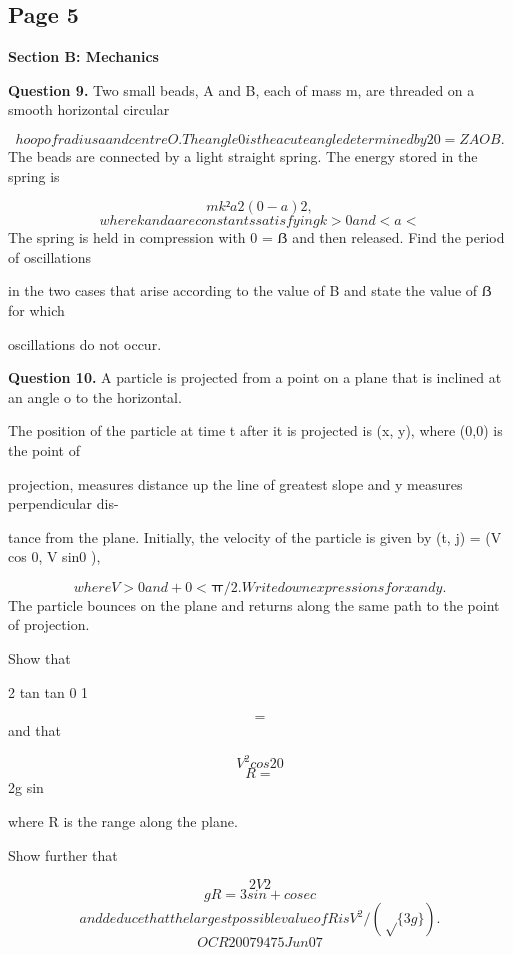\documentclass[12pt]{article}
\begin{document}
\subsection*{Page 5}
\begin{flushleft}
\bigskip\textbf{Section B: Mechanics}\par
\bigskip\textbf{Question 9.} Two small beads, A and B, each of mass m, are threaded on a smooth horizontal circular\par
\[hoop of radius a and centre O. The angle 0 is the acute angle determined by 20 = ZAOB.\]
The beads are connected by a light straight spring. The energy stored in the spring is\par
\[mk²a2(0-a)2,\]
\[where k and a are constants satisfying k > 0 and <a <\]
The spring is held in compression with 0 = ẞ and then released. Find the period of oscillations\par
in the two cases that arise according to the value of B and state the value of ẞ for which\par
oscillations do not occur.\par
\bigskip\textbf{Question 10.} A particle is projected from a point on a plane that is inclined at an angle o to the horizontal.\par
The position of the particle at time t after it is projected is (x, y), where (0,0) is the point of\par
projection, measures distance up the line of greatest slope and y measures perpendicular dis-\par
tance from the plane. Initially, the velocity of the particle is given by (t, j) = (V cos 0, V sin0 ),\par
\[where V > 0 and + 0 <ㅠ/2. Write down expressions for x and y.\]
The particle bounces on the plane and returns along the same path to the point of projection.\par
Show that\par
2 tan tan 0 1\par
\[=\]
and that\par
\[V^2 cos2 0\]
\[R=\]
2g sin\par
where R is the range along the plane.\par
Show further that\par
\[2V2\]
\[gR = 3 sin + cosec\]
\[and deduce that the largest possible value of R is V^2/(\sqrt\{3g\}).\]
\[OCR 2007 9475 Jun07\]
\end{flushleft}
\end{document}
